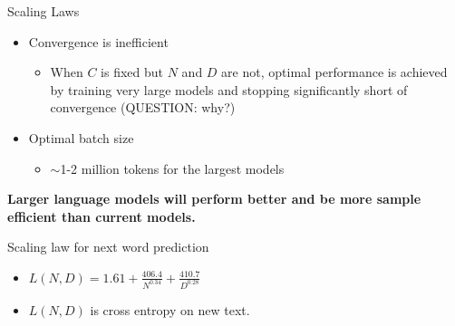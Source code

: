 
\begin{vbframe}{Scaling Laws}

\vfill

\begin{itemize}

	\item Convergence is inefficient
	\begin{itemize}
	\item When $C$ is fixed but $N$ and $D$ are not,
	optimal performance is achieved by training very
	large models and stopping significantly short of
	convergence (QUESTION: why?)  
	\end{itemize}

	\item Optimal batch size \qmark
	\begin{itemize}
	\item $\sim$1-2 million tokens for the largest models 
	\end{itemize}

\end{itemize}

\vskip3mm

\textbf{Larger language models will perform better and be
	more sample efficient than current models. \qmark} 

\vfill

\end{vbframe}


\begin{vbframe}{Scaling law for next word prediction}

\vfill

\begin{itemize}


\item $L(N,D) = 1.61 + \frac{406.4}{N^{0.34}}        + \frac{410.7}{D^{0.28}}$        

\item $L(N,D)$ is cross entropy on new text.
        
	\end{itemize}


\vskip3mm


\vfill

\end{vbframe}

